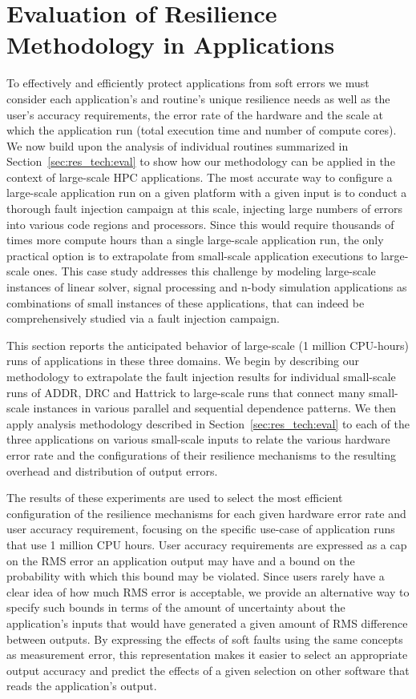 \documentclass[10pt, conference, compsocconf]{IEEEtran}
\begin{document}
\section{Evaluation of Resilience Methodology in Applications}
\label{sec:eval}

To effectively and efficiently protect applications from soft errors we must consider each application's and routine's unique resilience needs as well as the user's accuracy requirements, the error rate of the hardware and the scale at which the application run (total execution time and number of compute cores).
We now build upon the analysis of individual routines summarized in Section~\ref{sec:res_tech:eval} to show how our methodology can be applied in the context of large-scale HPC applications.
The most accurate way to configure a large-scale application run on a given platform with a given input is to conduct a thorough fault injection campaign at this scale, injecting large numbers of errors into various code regions and processors.
Since this would require thousands of times more compute hours than a single large-scale application run, the only practical option is to extrapolate from small-scale application executions to large-scale ones.
This case study addresses this challenge by modeling large-scale instances of linear solver, signal processing and n-body simulation applications as combinations of small instances of these applications, that can indeed be comprehensively studied via a fault injection campaign.

This section reports the anticipated behavior of large-scale (1 million CPU-hours) runs of applications in these three domains.
We begin by describing our methodology to extrapolate the fault injection results for individual small-scale runs of ADDR, DRC and Hattrick to large-scale runs that connect many small-scale instances in various parallel and sequential dependence patterns.
We then apply analysis methodology described in Section~\ref{sec:res_tech:eval} to each of the three applications on various small-scale inputs to relate the various hardware error rate and the configurations of their resilience mechanisms to the resulting overhead and distribution of output errors.

The results of these experiments are used to select the most efficient configuration of the resilience mechanisms for each given hardware error rate and user accuracy requirement, focusing on the specific use-case of application runs that use 1 million CPU hours.
User accuracy requirements are expressed as a cap on the RMS error an application output may have and a bound on the probability with which this bound may be violated.
Since users rarely have a clear idea of how much RMS error is acceptable, we provide an alternative way to specify such bounds in terms of the amount of uncertainty about the application's inputs that would have generated a given amount of RMS difference between outputs.
By expressing the effects of soft faults using the same concepts as measurement error, this representation makes it easier to select an appropriate output accuracy and predict the effects of a given selection on other software that reads the application's output.
\end{document}
